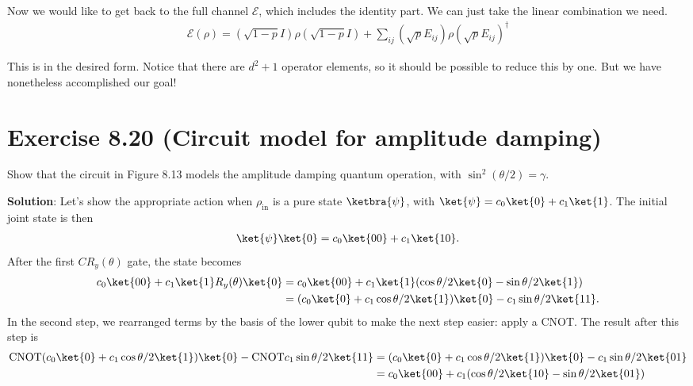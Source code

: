 \documentclass{book}
\begin{document}
    Now we would like to get back to the full channel $\mathcal{E}$, which includes the identity part. We can just take the linear combination we need.
    \begin{align}
        \mathcal{E}(\rho) = (\sqrt{1-p} I )\rho (\sqrt{1-p} I ) + \sum_{ij} (\sqrt{p} E_{ij}) \rho (\sqrt{p}E_{ij})^\dagger 
    \end{align}

    This is in the desired form. Notice that there are $d^2 +1$ operator elements, so it should be possible to reduce this by one. But we have nonetheless accomplished our goal!

\section*{Exercise 8.20 (Circuit model for amplitude damping)}
    Show that the circuit in Figure 8.13 models the amplitude damping quantum operation, with $\sin^2(\theta/2) = \gamma$.

    \textbf{Solution}: Let's show the appropriate action when $\rho_\mathrm{in}$ is a pure state $\ketbra{\psi}$, with $\ket{\psi} = c_0 \ket{0} + c_1 \ket{1}$. The initial joint state is then
    \begin{align}
        \ket{\psi}\ket{0} = c_0 \ket{00} + c_1 \ket{10}.
    \end{align}
    After the first $CR_y(\theta)$ gate, the state becomes
    \begin{align}
    \begin{aligned}
        c_0 \ket{00} + c_1 \ket{1}R_y(\theta)\ket{0} &= c_0\ket{00} + c_1 \ket{1}(\cos\theta/2 \ket{0} - \sin\theta/2 \ket{1}) \\
        &= (c_0\ket{0} + c_1 \cos\theta/2 \ket{1})\ket{0} - c_1 \sin\theta/2 \ket{11}.
    \end{aligned}
    \end{align}
    In the second step, we rearranged terms by the basis of the lower qubit to make the next step easier: apply a CNOT. The result after this step is
    \begin{align}
    \begin{aligned}
        \mathrm{CNOT}(c_0\ket{0} + c_1 \cos\theta/2 \ket{1})\ket{0} - \mathrm{CNOT }c_1 \sin\theta/2 \ket{11} &= (c_0\ket{0} + c_1 \cos\theta/2 \ket{1})\ket{0} - c_1 \sin\theta/2 \ket{01} \\
        &= c_0 \ket{00} + c_1 (\cos\theta/2 \ket{10} - \sin\theta/2\ket{01})
    \end{aligned}
    \end{align}
\end{document}
